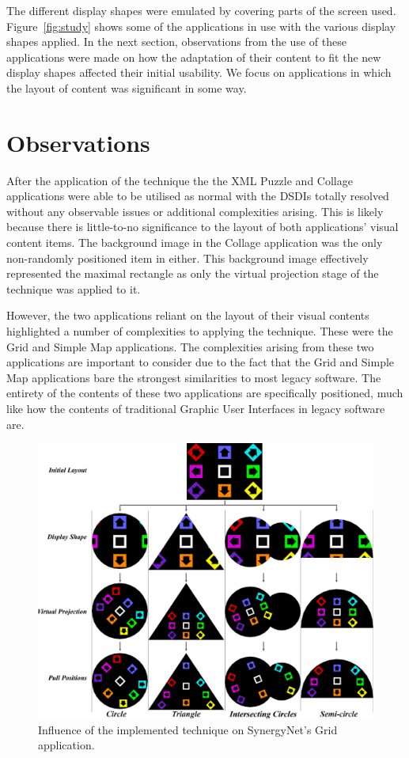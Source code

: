 \documentclass[review,5p,times,twocolumn]{elsarticle}
\begin{document}
The different display shapes were emulated by covering parts of the screen used.
Figure~\ref{fig:study} shows some of the applications in use with the various display shapes applied.
In the next section, observations from the use of these applications were made on how the adaptation of their content to fit the new display shapes affected their initial usability.
We focus on applications in which the layout of content was significant in some way.

\section{Observations}
\label{sec:observations}

After the application of the technique the the XML Puzzle and Collage applications were able to be utilised as normal with the \acp{DSDI} totally resolved without any observable issues or additional complexities arising.
This is likely because there is little-to-no significance to the layout of both applications' visual content items.
The background image in the Collage application was the only non-randomly positioned item in either.
This background image effectively represented the maximal rectangle as only the virtual projection stage of the technique was applied to it.

However, the two applications reliant on the layout of their visual contents highlighted a number of complexities to applying the technique.
These were the Grid and Simple Map applications.
The complexities arising from these two applications are important to consider due to the fact that the Grid and Simple Map applications bare the strongest similarities to most legacy software.
The entirety of the contents of these two applications are specifically positioned, much like how the contents of traditional Graphic User Interfaces in legacy software are.

\begin{figure}[t!] 
	\centerline{\includegraphics[width=1\textwidth]{figures/grid_app.png}}
	\caption{Influence of the implemented technique on SynergyNet's Grid application.}
	\label{fig:gridApp}
\end{figure}
\end{document}
